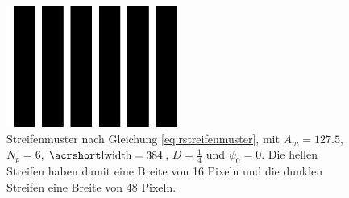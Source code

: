 \begin{figure}[H]
	\centering
	\includegraphics[frame,width=0.5\textwidth]{03_sichtpruefungDurchLichtstreuung/optimierungen/musterMitUnterschiedlichenStreifenbreiten/figures/impulsschwingungStreifenmuster}
	\caption[Rechteckförmiges Streifenmuster]{Streifenmuster nach Gleichung \ref{eq:rstreifenmuster}, mit $A_m = 127.5$, $N_p = 6$, $\acrshortmath{lwidth} = 384$, $D = \tfrac{1}{4}$ und $\psi_0 = 0$. Die hellen Streifen haben damit eine Breite von 16 Pixeln und die dunklen Streifen eine Breite von 48 Pixeln.}
	\label{img:impulsschwingungStreifenmuster}
\end{figure}